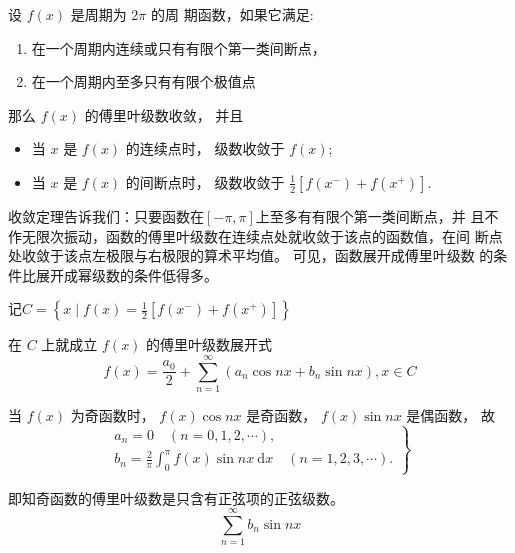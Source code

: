 \begin{theorem}
    设 $ f(x) $ 是周期为 $ 2 \pi $ 的周 期函数，如果它满足:

    \begin{enumerate}
        \item 在一个周期内连续或只有有限个第一类间断点，
        \item 在一个周期内至多只有有限个极值点
    \end{enumerate}

    那么 $ f(x) $ 的傅里叶级数收敛， 并且

    \begin{itemize}
    \item 当 $ x $ 是 $ f(x) $ 的连续点时， 级数收敛于 $ f(x) $;
    \item 当 $ x $ 是 $ f(x) $ 的间断点时， 级数收敛于 $ \frac{1}{2}\left[f\left(x^{-}\right)+f\left(x^{+}\right)\right] $.
    \end{itemize}
\end{theorem}

收敛定理告诉我们：只要函数在$[-\pi,\pi]$上至多有有限个第一类间断点，并
且不作无限次振动，函数的傅里叶级数在连续点处就收敛于该点的函数值，在间
断点处收敛于该点左极限与右极限的算术平均值。 可见，函数展开成傅里叶级数
的条件比展开成幂级数的条件低得多。 

\begin{corollary}
    记$
C=\left\{x \mid f(x)=\frac{1}{2}\left[f\left(x^{-}\right)+f\left(x^{+}\right)\right]\right\}
$

在 $ C $ 上就成立 $ f(x) $ 的傅里叶级数展开式
\begin{equation}
f(x)=\frac{a_{0}}{2}+\sum_{n=1}^{\infty}\left(a_{n} \cos n x+b_{n} \sin n x\right), x \in C
\end{equation}
\end{corollary}

\begin{definition}[正弦级数]
    当 $ f(x) $ 为奇函数时， $ f(x) \cos n x $ 是奇函数， $ f(x) \sin n x $ 是偶函数， 故
\begin{equation}
\left.\begin{array}{l}
a_{n}=0 \quad(n=0,1,2, \cdots), \\
b_{n}=\frac{2}{\pi} \int_{0}^{\pi} f(x) \sin n x \mathrm{~d} x \quad(n=1,2,3, \cdots) .
\end{array}\right\}
\end{equation}

即知奇函数的傅里叶级数是只含有正弦项的正弦级数。
\begin{equation} \sum_{n=1}^{\infty} b_{n} \sin n x \end{equation}
\end{definition}

